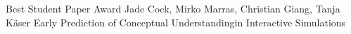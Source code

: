 \documentclass[a4paper,landscape]{article} %
\begin{document}
\diploma
    {Best Student Paper Award}
    {Jade Cock, Mirko Marras, Christian Giang, Tanja Käser}
    {Early Prediction of Conceptual Understanding\newline in Interactive Simulations}
\hfill
\end{document}
